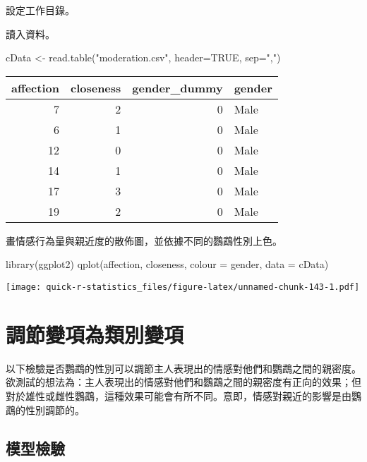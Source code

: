 \documentclass[
]{book}
\newenvironment{Shaded}{\begin{snugshade}}{\end{snugshade}}
\newcommand{\AttributeTok}[1]{\textcolor[rgb]{0.77,0.63,0.00}{#1}}
\newcommand{\ConstantTok}[1]{\textcolor[rgb]{0.00,0.00,0.00}{#1}}
\newcommand{\FunctionTok}[1]{\textcolor[rgb]{0.00,0.00,0.00}{#1}}
\newcommand{\NormalTok}[1]{#1}
\newcommand{\OtherTok}[1]{\textcolor[rgb]{0.56,0.35,0.01}{#1}}
\newcommand{\StringTok}[1]{\textcolor[rgb]{0.31,0.60,0.02}{#1}}
\begin{document}
設定工作目錄。

讀入資料。

\begin{Shaded}
\begin{Highlighting}[]
\NormalTok{cData }\OtherTok{\textless{}{-}} \FunctionTok{read.table}\NormalTok{(}\StringTok{"moderation.csv"}\NormalTok{, }\AttributeTok{header=}\ConstantTok{TRUE}\NormalTok{, }\AttributeTok{sep=}\StringTok{","}\NormalTok{)}
\end{Highlighting}
\end{Shaded}

\begin{tabular}{r|r|r|l}
\hline
affection & closeness & gender\_dummy & gender\\
\hline
7 & 2 & 0 & Male\\
\hline
6 & 1 & 0 & Male\\
\hline
12 & 0 & 0 & Male\\
\hline
14 & 1 & 0 & Male\\
\hline
17 & 3 & 0 & Male\\
\hline
19 & 2 & 0 & Male\\
\hline
\end{tabular}

畫情感行為量與親近度的散佈圖，並依據不同的鸚鵡性別上色。

\begin{Shaded}
\begin{Highlighting}[]
\FunctionTok{library}\NormalTok{(ggplot2)}
\FunctionTok{qplot}\NormalTok{(affection, closeness, }\AttributeTok{colour =}\NormalTok{ gender, }\AttributeTok{data =}\NormalTok{ cData)}
\end{Highlighting}
\end{Shaded}

\texttt{[image: quick-r-statistics\_files/figure-latex/unnamed-chunk-143-1.pdf]}

\hypertarget{ux8abfux7bc0ux8b8aux9805ux70baux985eux5225ux8b8aux9805}{%
\section{調節變項為類別變項}\label{ux8abfux7bc0ux8b8aux9805ux70baux985eux5225ux8b8aux9805}}

以下檢驗是否鸚鵡的性別可以調節主人表現出的情感對他們和鸚鵡之間的親密度。欲測試的想法為：主人表現出的情感對他們和鸚鵡之間的親密度有正向的效果；但對於雄性或雌性鸚鵡，這種效果可能會有所不同。意即，情感對親近的影響是由鸚鵡的性別調節的。

\hypertarget{ux6a21ux578bux6aa2ux9a57}{%
\subsection{模型檢驗}\label{ux6a21ux578bux6aa2ux9a57}}
\end{document}
